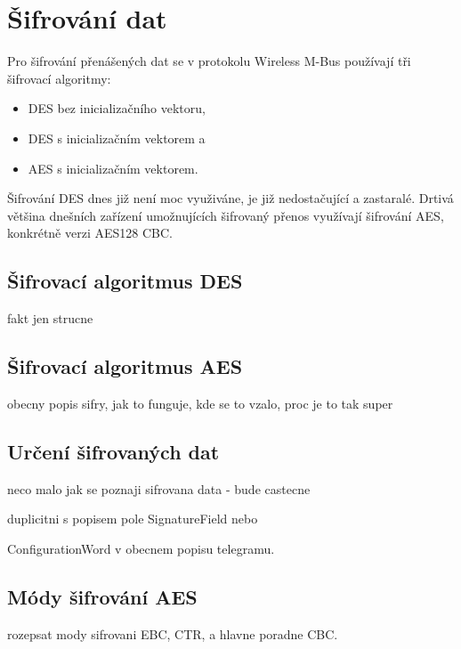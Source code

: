 
\section{Šifrování dat}

Pro šifrování přenášených dat se v protokolu Wireless M-Bus používají tři šifrovací algoritmy:
\begin{itemize}
	\item DES bez inicializačního vektoru,
	\item DES s inicializačním vektorem a
	\item AES s inicializačním vektorem.
\end{itemize}

Šifrování DES dnes již není moc využiváne, je již nedostačující a zastaralé. Drtivá většina dnešních zařízení umožnujících šifrovaný přenos využívají šifrování AES, konkrétně verzi AES128 CBC.

\subsection{Šifrovací algoritmus DES}
\colorbox[rgb]{1,0,0}{fakt jen strucne}

\subsection{Šifrovací algoritmus AES}
\colorbox[rgb]{1,0,0}{obecny popis sifry, jak to funguje, kde se to vzalo, proc je to tak super}


\subsection{Určení šifrovaných dat}
\colorbox[rgb]{1,0,0}{neco malo jak se poznaji sifrovana data - bude castecne }

\colorbox[rgb]{1,0,0}{duplicitni s popisem pole SignatureField nebo }

\colorbox[rgb]{1,0,0}{ConfigurationWord v obecnem popisu telegramu.}


\subsection{Módy šifrování AES}
\colorbox[rgb]{1,0,0}{rozepsat mody sifrovani EBC, CTR, a hlavne poradne CBC.}

